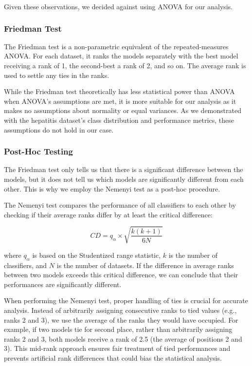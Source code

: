 Given these observations, we decided against using ANOVA for our analysis.

\subsubsection{Friedman Test}
The Friedman test is a non-parametric equivalent of the repeated-measures ANOVA. 
For each dataset, it ranks the models separately with the best model receiving a rank of 1, the second-best a rank of 2, and so on.
The average rank is used to settle any ties in the ranks\cite{StatisticalComparisonsOfClassifiersOverMultipleDataSetsJML}.

While the Friedman test theoretically has less statistical power than ANOVA when ANOVA's assumptions are met,
it is more suitable for our analysis as it makes no assumptions about normality or equal variances.
As we demonstrated with the hepatitis dataset's class distribution and performance metrics, these assumptions do not hold in our case.

\subsubsection{Post-Hoc Testing}
The Friedman test only tells us that there is a significant difference between the models,
but it does not tell us which models are significantly different from each other.
This is why we employ the Nemenyi test as a post-hoc procedure.

The Nemenyi test compares the performance of all classifiers to each
other by checking if their average ranks differ by at least the critical difference:

\begin{equation}
    CD = q_{\alpha} \times \sqrt{\frac{k(k+1)}{6N}}
\end{equation}

where $q_{\alpha}$ is based on the Studentized range statistic, $k$ is the number of classifiers, and $N$ is the number of datasets\cite{StatisticalComparisonsOfClassifiersOverMultipleDataSetsJML}.
If the difference in average ranks between two models exceeds this critical difference, we can conclude that their performances are significantly different.

When performing the Nemenyi test, proper handling of ties is crucial for accurate analysis.
Instead of arbitrarily assigning consecutive ranks to tied values (e.g., ranks 2 and 3), we use the
average of the ranks they would have occupied. For example, if two models tie for second place,
rather than arbitrarily assigning ranks 2 and 3, both models receive a rank of 2.5 (the average of positions 2 and 3).
This mid-rank approach ensures fair treatment of tied performances and prevents artificial rank differences that could bias the statistical analysis.

